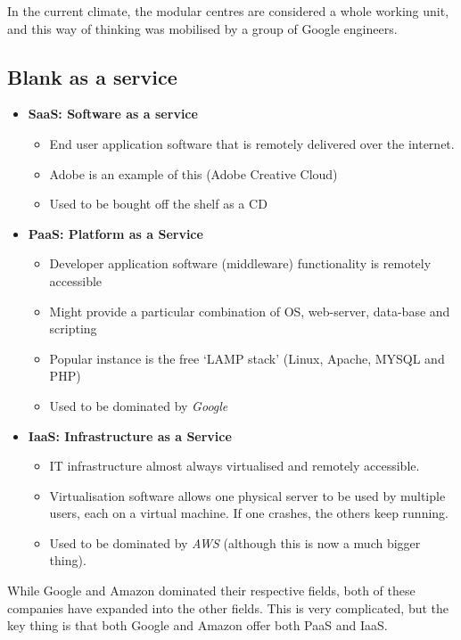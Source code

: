 \documentclass[11pt,a4paper,titlepage,dvipsnames,cmyk]{scrartcl}
\begin{document}
In the current climate, the modular centres are considered a whole working unit, and this way of thinking was mobilised by a group of Google engineers.

\subsection{Blank as a service}
\begin{itemize}
    \item \textbf{SaaS: Software as a service}
    \begin{itemize}
        \item End user application software that is remotely delivered over the internet.
        \item Adobe is an example of this (Adobe Creative Cloud)
        \item Used to be bought off the shelf as a CD
    \end{itemize}
    \item \textbf{PaaS: Platform as a Service}
    \begin{itemize}
        \item Developer application software (middleware) functionality is remotely accessible
        \item Might provide a particular combination of OS, web-server, data-base and scripting
        \item Popular instance is the free `LAMP stack' (Linux, Apache, MYSQL and PHP)
        \item Used to be dominated by \textit{Google}
    \end{itemize}
    \item \textbf{IaaS: Infrastructure as a Service}
    \begin{itemize}
        \item IT infrastructure almost always virtualised and remotely accessible.
        \item Virtualisation software allows one physical server to be used by multiple users, each on a virtual machine. If one crashes, the others keep running.
        \item Used to be dominated by \textit{AWS} (although this is now a much bigger thing).
    \end{itemize}
\end{itemize}

While Google and Amazon dominated their respective fields, both of these companies have expanded into the other fields. This is very complicated, but the key thing is that both Google and Amazon offer both PaaS and IaaS.
\end{document}
